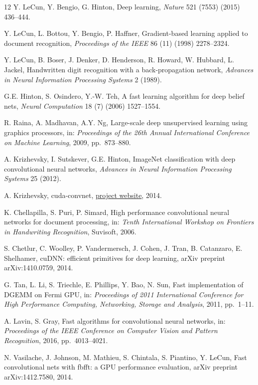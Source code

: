 \begin{chapterbibliography}{12}
  Y. LeCun, Y. Bengio, G. Hinton, Deep learning,
  \emph{Nature} 521 (7553) (2015) 436--444.

  Y. LeCun, L. Bottou, Y. Bengio, P. Haffner, Gradient-based learning applied to
  document recognition, \emph{Proceedings of the IEEE} 86 (11) (1998) 2278--2324.

  Y. LeCun, B. Boser, J. Denker, D. Henderson, R. Howard, W. Hubbard, L. Jackel,
  Handwritten digit recognition with a back-propagation network,
  \emph{Advances in Neural Information Processing Systems} 2 (1989).

  G.E. Hinton, S. Osindero, Y.-W. Teh, A fast learning algorithm for deep belief nets,
  \emph{Neural Computation} 18 (7) (2006) 1527--1554.

  R. Raina, A. Madhavan, A.Y. Ng, Large-scale deep unsupervised learning using graphics
  processors, in: \emph{Proceedings of the 26th Annual International Conference on
  Machine Learning}, 2009, pp.~873--880.

  A. Krizhevsky, I. Sutskever, G.E. Hinton, ImageNet classification with deep
  convolutional neural networks, \emph{Advances in Neural Information Processing
  Systems} 25 (2012).

  A. Krizhevsky, cuda-convnet,
  \href{https://code.google.com/p/cuda-convnet/}{project website}, 2014.

  K. Chellapilla, S. Puri, P. Simard, High performance convolutional neural networks
  for document processing, in: \emph{Tenth International Workshop on Frontiers in
  Handwriting Recognition}, Suvisoft, 2006.

  S. Chetlur, C. Woolley, P. Vandermersch, J. Cohen, J. Tran, B. Catanzaro,
  E. Shelhamer, cuDNN: efficient primitives for deep learning,
  arXiv preprint arXiv:1410.0759, 2014.

  G. Tan, L. Li, S. Triechle, E. Phillips, Y. Bao, N. Sun, Fast implementation of
  DGEMM on Fermi GPU, in: \emph{Proceedings of 2011 International Conference for
  High Performance Computing, Networking, Storage and Analysis}, 2011, pp.~1--11.

  A. Lavin, S. Gray, Fast algorithms for convolutional neural networks, in:
  \emph{Proceedings of the IEEE Conference on Computer Vision and Pattern Recognition},
  2016, pp.~4013--4021.

  N. Vasilache, J. Johnson, M. Mathieu, S. Chintala, S. Piantino, Y. LeCun,
  Fast convolutional nets with fbfft: a GPU performance evaluation,
  arXiv preprint arXiv:1412.7580, 2014.
\end{chapterbibliography}
